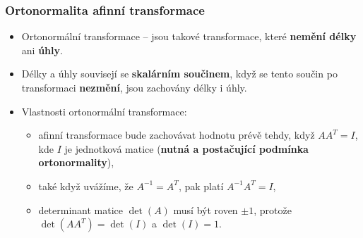 \subsubsection{Ortonormalita afinní transformace}
\begin{itemize}
	\item Ortonormální transformace -- jsou takové transformace, které \textbf{nemění délky} ani \textbf{úhly}.
	\item Délky a úhly souvisejí se \textbf{skalárním součinem}, když se tento součin po transformaci \textbf{nezmění}, jsou zachovány délky i úhly.
	\item Vlastnosti ortonormální transformace:
		\begin{itemize}
			\item afinní transformace bude zachovávat hodnotu prévě tehdy, když $AA^T=I$, kde $I$ je jednotková matice (\textbf{nutná a postačující podmínka ortonormality}),
			\item také když uvážíme, že $A^{-1} = A^T$, pak platí $A^{-1} A^T = I$,
			\item determinant matice $\det(A)$ musí být roven $\pm 1$, protože $\det(AA^T) = \det(I)$ a $\det(I) = 1$.
		\end{itemize}
\end{itemize}

